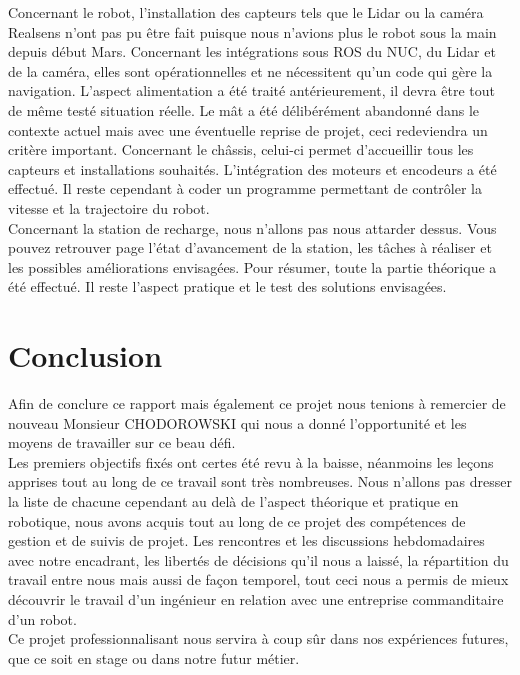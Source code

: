 \documentclass[french]{rapportENSTAB}
\begin{document}
Concernant le robot, l'installation des capteurs tels que le Lidar ou la caméra Realsens n'ont pas pu être fait puisque nous n'avions plus le robot sous la main depuis début Mars. Concernant les intégrations sous ROS du NUC, du Lidar et de la caméra, elles sont opérationnelles et ne nécessitent qu'un code qui gère la navigation. L'aspect alimentation a été traité antérieurement, il devra être tout de même testé situation réelle. Le mât a été délibérément abandonné dans le contexte actuel mais avec une éventuelle reprise de projet, ceci redeviendra un critère important. Concernant le châssis, celui-ci permet d'accueillir tous les capteurs et installations souhaités. L'intégration des moteurs et encodeurs a été effectué. Il reste cependant à coder un programme permettant de contrôler la vitesse et la trajectoire du robot.\\

Concernant la station de recharge, nous n'allons pas nous attarder dessus. Vous pouvez retrouver page \pageref{station} l'état d'avancement de la station, les tâches à réaliser et les possibles améliorations envisagées. Pour résumer, toute la partie théorique a été effectué. Il reste l'aspect pratique et le test des solutions envisagées.



\section{Conclusion}

Afin de conclure ce rapport mais également ce projet nous tenions à remercier de nouveau Monsieur CHODOROWSKI qui nous a donné l'opportunité et les moyens de travailler sur ce beau défi. \\

Les premiers objectifs fixés ont certes été revu à la baisse, néanmoins les leçons apprises tout au long de ce travail sont très nombreuses. Nous n'allons pas dresser la liste de chacune cependant au delà de l'aspect théorique et pratique en robotique, nous avons acquis tout au long de ce projet des compétences de gestion et de suivis de projet. Les rencontres et les discussions hebdomadaires avec notre encadrant, les libertés de décisions qu'il nous a laissé, la répartition du travail entre nous mais aussi de façon temporel, tout ceci nous a permis de mieux découvrir le travail d'un ingénieur en relation avec une entreprise commanditaire d'un robot. \\

Ce projet professionnalisant nous servira à coup sûr dans nos expériences futures, que ce soit en stage ou dans notre futur métier. \\
\end{document}
